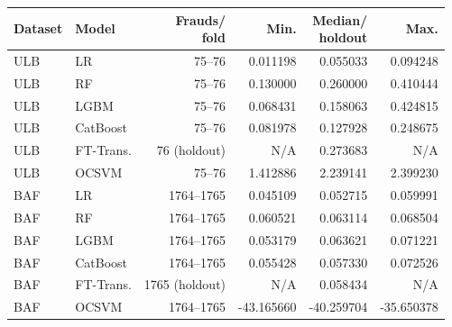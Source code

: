 \begin{tabular}{@{}l l r r r r@{}}
\toprule
Dataset & Model & \shortstack{Frauds/\\fold} & Min. & \shortstack{Median/\\holdout} & Max. \\
\midrule
ULB & LR & 75--76 & 0.011198 & 0.055033 & 0.094248 \\
ULB & RF & 75--76 & 0.130000 & 0.260000 & 0.410444 \\
ULB & LGBM & 75--76 & 0.068431 & 0.158063 & 0.424815 \\
ULB & CatBoost & 75--76 & 0.081978 & 0.127928 & 0.248675 \\
ULB & FT-Trans. & 76 (holdout) & N/A & 0.273683 & N/A \\
ULB & OCSVM & 75--76 & 1.412886 & 2.239141 & 2.399230 \\
BAF & LR & 1764--1765 & 0.045109 & 0.052715 & 0.059991 \\
BAF & RF & 1764--1765 & 0.060521 & 0.063114 & 0.068504 \\
BAF & LGBM & 1764--1765 & 0.053179 & 0.063621 & 0.071221 \\
BAF & CatBoost & 1764--1765 & 0.055428 & 0.057330 & 0.072526 \\
BAF & FT-Trans. & 1765 (holdout) & N/A & 0.058434 & N/A \\
BAF & OCSVM & 1764--1765 & -43.165660 & -40.259704 & -35.650378 \\
\bottomrule
\end{tabular}
